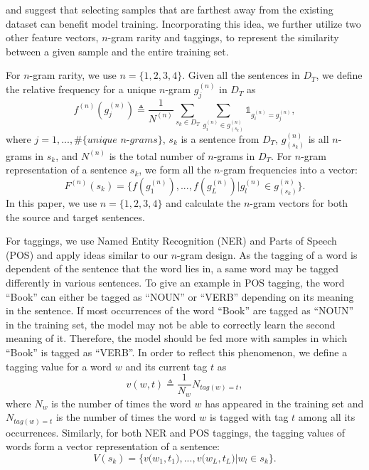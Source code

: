 \documentclass[letterpaper]{article}
\begin{document}
\cite{yang2015multi} and \cite{sener2018active} suggest that selecting samples that are farthest away from the existing dataset can benefit model training. 
Incorporating this idea, we further utilize two other feature vectors, $n$-gram rarity and taggings, to represent the similarity between a given sample and the entire training set. 

For $n$-gram rarity, we use $n=\{1,2,3,4\}$. Given all the sentences in $D_T$, we define the relative frequency for a unique $n$-gram $g^{(n)}_j$ in $D_T$ as
\begin{equation}
	\label{eq:ngram}
	f^{(n)}(g^{(n)}_j) \triangleq \frac{1}{N^{(n)}} \sum_{s_k \in D_T} \sum_{g^{(n)}_i \in g^{(n)}_{(s_k)}} \mathds{1}_{g^{(n)}_i=g^{(n)}_j},
\end{equation}
where $j=1,...,\#\textit{\{unique n-grams\}}$, $s_k$ is a sentence from $D_T$, $g^{(n)}_{(s_k)}$ is all $n$-grams in $s_k$, and $N^{(n)}$ is the total number of $n$-grams in $D_T$. For $n$-gram representation of a sentence $s_k$, we form all the $n$-gram frequencies into a vector:
\begin{equation}
	\label{eq:ngramSent}
	F^{(n)}(s_k) = \{f(g^{(n)}_1),...,f(g^{(n)}_L)|g^{(n)}_l \in g^{(n)}_{(s_k)}\}.
\end{equation}
In this paper, we use $n=\{1,2,3,4\}$ and calculate the $n$-gram vectors for both the source and target sentences.

For taggings, we use Named Entity Recognition (NER) and Parts of Speech (POS) and apply ideas similar to our $n$-gram design. As the tagging of a word is dependent of the sentence that the word lies in, a same word may be tagged differently in various sentences. To give an example in POS tagging, the word ``Book'' can either be tagged as ``NOUN'' or ``VERB'' depending on its meaning in the sentence. If most occurrences of the word ``Book'' are tagged as ``NOUN'' in the training set, the model may not be able to correctly learn the second meaning of it. Therefore, the model should be fed more with samples in which ``Book'' is tagged as ``VERB''. In order to reflect this phenomenon, we define a tagging value for a word $w$ and its current tag $t$ as
\begin{equation}
	\label{eq:tagging}
	v(w,t) \triangleq \frac{1}{N_w} N_{tag(w)=t},
\end{equation}
where $N_w$ is the number of times the word $w$ has appeared in the training set and $N_{tag(w)=t}$ is the number of times the word $w$ is tagged with tag $t$ among all its occurrences. 
Similarly, for both NER and POS taggings, the tagging values of words form a vector representation of a sentence:
\begin{equation}
	\label{eq:taggingSent}
	V(s_k) = \Big\{v\Big(w_1,t_1\Big),...,v\Big(w_L,t_L\Big)|w_l \in s_k\Big\}.
\end{equation}
\end{document}
